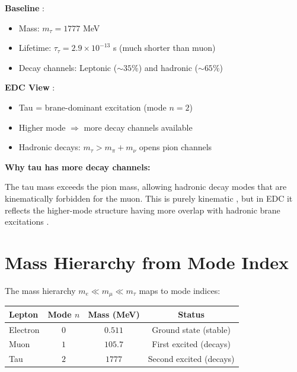 \begin{tcolorbox}[colback=purple!5!white, colframe=purple!50!black,
    title=\textbf{Tau at a Glance}]
\textbf{Baseline} \tagBL{}:
\begin{itemize}[nosep]
    \item Mass: $m_\tau = 1777$ MeV
    \item Lifetime: $\tau_\tau = 2.9 \times 10^{-13}$ s (much shorter than muon)
    \item Decay channels: Leptonic ($\sim 35\%$) and hadronic ($\sim 65\%$)
\end{itemize}

\textbf{EDC View} \tagP{}:
\begin{itemize}[nosep]
    \item Tau = brane-dominant excitation (mode $n = 2$)
    \item Higher mode $\Rightarrow$ more decay channels available
    \item Hadronic decays: $m_\tau > m_\pi + m_\nu$ opens pion channels
\end{itemize}
\end{tcolorbox}

\textbf{Why tau has more decay channels:}

The tau mass exceeds the pion mass, allowing hadronic decay modes that are
kinematically forbidden for the muon. This is purely kinematic \tagBL{}, but
in EDC it reflects the higher-mode structure having more overlap with
hadronic brane excitations \tagI{}.

\section{Mass Hierarchy from Mode Index}
\label{sec:mass_hierarchy}

The mass hierarchy $m_e \ll m_\mu \ll m_\tau$ maps to mode indices:

\begin{center}
\begin{tabular}{lccc}
\toprule
\textbf{Lepton} & \textbf{Mode $n$} & \textbf{Mass (MeV)} & \textbf{Status} \\
\midrule
Electron & $0$ & $0.511$ & Ground state (stable) \\
Muon & $1$ & $105.7$ & First excited (decays) \\
Tau & $2$ & $1777$ & Second excited (decays) \\
\bottomrule
\end{tabular}
\end{center}


